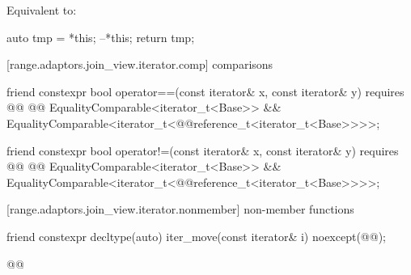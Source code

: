 \begin{itemdescr}
\pnum
\effects Equivalent to:
\begin{codeblock}
auto tmp = *this;
--*this;
return tmp;
\end{codeblock}
\end{itemdescr}

[range.adaptors.join_view.iterator.comp]{ comparisons}

\begin{itemdecl}
friend constexpr bool operator==(const iterator& x, const iterator& y)
  requires @@
    @@ EqualityComparable<iterator_t<Base>> &&
    EqualityComparable<iterator_t<@@reference_t<iterator_t<Base>>>>;
\end{itemdecl}

\begin{itemdescr}
\pnum
\oldtxt{\returns} 
\end{itemdescr}

\begin{itemdecl}
friend constexpr bool operator!=(const iterator& x, const iterator& y)
  requires @@
    @@ EqualityComparable<iterator_t<Base>> &&
    EqualityComparable<iterator_t<@@reference_t<iterator_t<Base>>>>;
\end{itemdecl}

\begin{itemdescr}
\pnum
\oldtxt{\returns} 
\end{itemdescr}

[range.adaptors.join_view.iterator.nonmember]{ non-member functions}

\begin{itemdecl}
friend constexpr decltype(auto) iter_move(const iterator& i)
  noexcept(@\oldtxt{\seebelow}@);
\end{itemdecl}

\begin{itemdescr}
\pnum
\oldtxt{\returns} 

\pnum
{}
\begin{codeblock}
@@
\end{codeblock}
\end{itemdescr}

